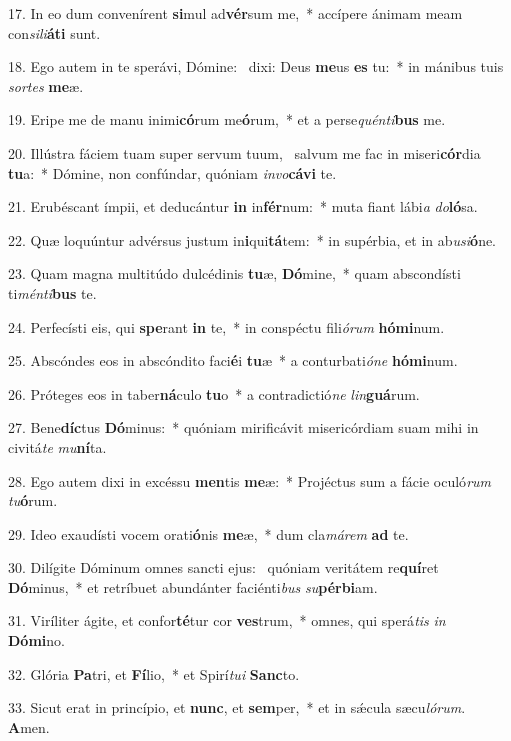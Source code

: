 17. In eo dum convenírent \textbf{si}mul ad\textbf{vér}sum me,~*  accípere ánimam meam con\textit{si}\textit{li}\textbf{á}\textbf{ti} sunt.\

18. Ego autem in te sperávi, Dómine: \dag\  dixi: Deus \textbf{me}us \textbf{es} tu:~*  in mánibus tuis \textit{sor}\textit{tes} \textbf{me}æ.\

19. Eripe me de manu inimi\textbf{có}rum me\textbf{ó}rum,~*  et a perse\textit{quén}\textit{ti}\textbf{bus} me.\

20. Illústra fáciem tuam super servum tuum, \dag\  salvum me fac in miseri\textbf{cór}dia \textbf{tu}a:~*  Dómine, non confúndar, quóniam \textit{in}\textit{vo}\textbf{cá}\textbf{vi} te.\

21. Erubéscant ímpii, et deducántur \textbf{in} in\textbf{fér}num:~*  muta fiant lábi\textit{a} \textit{do}\textbf{ló}sa.\

22. Quæ loquúntur advérsus justum in\textbf{i}qui\textbf{tá}tem:~*  in supérbia, et in ab\textit{u}\textit{si}\textbf{ó}ne.\

23. Quam magna multitúdo dulcédinis \textbf{tu}æ, \textbf{Dó}mine,~*  quam abscondísti ti\textit{mén}\textit{ti}\textbf{bus} te.\

24. Perfecísti eis, qui \textbf{spe}rant \textbf{in} te,~*  in conspéctu fili\textit{ó}\textit{rum} \textbf{hó}\textbf{mi}num.\

25. Abscóndes eos in abscóndito faci\textbf{é}i \textbf{tu}æ~*  a conturbati\textit{ó}\textit{ne} \textbf{hó}\textbf{mi}num.\

26. Próteges eos in taber\textbf{ná}culo \textbf{tu}o~*  a contradictió\textit{ne} \textit{lin}\textbf{guá}rum.\

27. Bene\textbf{díc}tus \textbf{Dó}minus:~*  quóniam mirificávit misericórdiam suam mihi in civitá\textit{te} \textit{mu}\textbf{ní}ta.\

28. Ego autem dixi in excéssu \textbf{men}tis \textbf{me}æ:~*  Projéctus sum a fácie oculó\textit{rum} \textit{tu}\textbf{ó}rum.\

29. Ideo exaudísti vocem orati\textbf{ó}nis \textbf{me}æ,~*  dum cla\textit{má}\textit{rem} \textbf{ad} te.\

30. Dilígite Dóminum omnes sancti ejus: \dag\  quóniam veritátem re\textbf{quí}ret \textbf{Dó}minus,~*  et retríbuet abundánter faciénti\textit{bus} \textit{su}\textbf{pér}\textbf{bi}am.\

31. Viríliter ágite, et confor\textbf{té}tur cor \textbf{ves}trum,~*  omnes, qui sperá\textit{tis} \textit{in} \textbf{Dó}\textbf{mi}no.\

32. Glória \textbf{Pa}tri, et \textbf{Fí}lio,~*  et Spirí\textit{tu}\textit{i} \textbf{Sanc}to.\

33. Sicut erat in princípio, et \textbf{nunc}, et \textbf{sem}per,~*  et in sǽcula sæcu\textit{ló}\textit{rum}. \textbf{A}men.\

